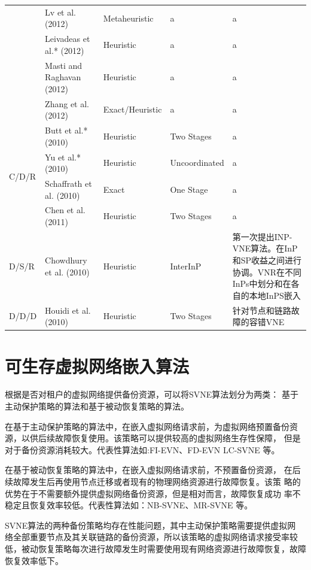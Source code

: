\begin{longtable}{lllll}
 & Lv et al. (2012)  & Metaheuristic & a & a\\
 & Leivadeas et al.* (2012)  & Heuristic & a & a\\
 & Masti and Raghavan (2012)  & Heuristic & a & a\\
 & Zhang et al. (2012)  & Exact/Heuristic & a & a\\
\hline
\multirow{4}{*}{C/D/R} & Butt et al.* (2010)  & Heuristic & Two Stages & a\\
 & Yu et al.* (2010)  & Heuristic & Uncoordinated & a\\
 & Schaffrath et al. (2010)  & Exact& One Stage & a\\
 & Chen et al. (2011)  & Heuristic & Two Stages & a\\
\hline
\multirow{1}{*}{D/S/R} & Chowdhury et al. (2010)  & Heuristic & InterInP & 第一次提出INP-VNE算法。在InP 和SP收益之间进行协调。VNR在不同InPs中划分和在各自的本地InPS嵌入\\
\hline
\multirow{1}{*}{D/D/D} & Houidi et al. (2010)  & Heuristic & Two Stages& 针对节点和链路故障的容错VNE\\
\end{longtable}\xiaosi
\vspace{\baselineskip}


\section{可生存虚拟网络嵌入算法}
根据是否对租户的虚拟网络提供备份资源，可以将SVNE算法划分为两类： 基于主动保护策略的算法和基于被动恢复策略的算法\cite{herker2013survey}。

在基于主动保护策略的算法中，在嵌入虚拟网络请求前，为虚拟网络预置备份资源，以供后续故障恢复使用。该策略可以提供较高的虚拟网络生存性保障， 但是对于备份资源消耗较大。代表性算法如:FI-EVN\cite{yu2011cost}、FD-EVN\cite{wang2014survivable} LC-SVNE\cite{hu2012location} 等。

在基于被动恢复策略的算法中，在嵌入虚拟网络请求前，不预置备份资源， 在后续故障发生后再使用节点迁移或者现有的物理网络资源进行故障恢复。该策 略的优势在于不需要额外提供虚拟网络备份资源，但是相对而言，故障恢复成功 率不稳定且恢复效率较低。代表性算法如：NB-SVNE\cite{bo2014dynamic}、MR-SVNE\cite{qiang2014heuristic} 等。

SVNE算法的两种备份策略均存在性能问题，其中主动保护策略需要提供虚拟网 络全部重要节点及其关联链路的备份资源，所以该策略的虚拟网络请求接受率较 低，被动恢复策略每次进行故障发生时需要使用现有网络资源进行故障恢复，故障恢复效率低下。


